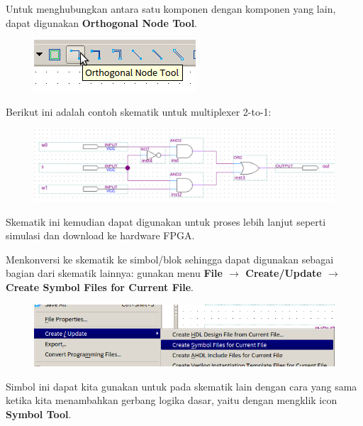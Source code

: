 Untuk menghubungkan antara satu komponen dengan komponen yang lain, dapat
digunakan \textbf{Orthogonal Node Tool}.
\begin{figure}[H]
\centering
\includegraphics[scale=0.5]{images/OrthogonalNodeTool.png}
\par
\end{figure}

Berikut ini adalah contoh skematik untuk multiplexer 2-to-1:
\begin{figure}[H]
\centering
\includegraphics[width=\textwidth]{images/sch_mux_2_1.png}
\par
\end{figure}

Skematik ini kemudian dapat digunakan untuk proses lebih lanjut seperti
simulasi dan download ke hardware FPGA.

Menkonversi ke skematik ke simbol/blok sehingga dapat digunakan sebagai
bagian dari skematik lainnya: gunakan menu \textbf{File $\rightarrow$
Create/Update $\rightarrow$ Create Symbol Files for Current File}.

\begin{figure}[H]
{\centering
\includegraphics[scale=0.5]{images/MenuCreateSymbol.png}
\par}
\end{figure}

Simbol ini dapat kita gunakan untuk pada skematik lain dengan cara
yang sama ketika kita menambahkan gerbang logika dasar, yaitu dengan
mengklik icon \textbf{Symbol Tool}.

